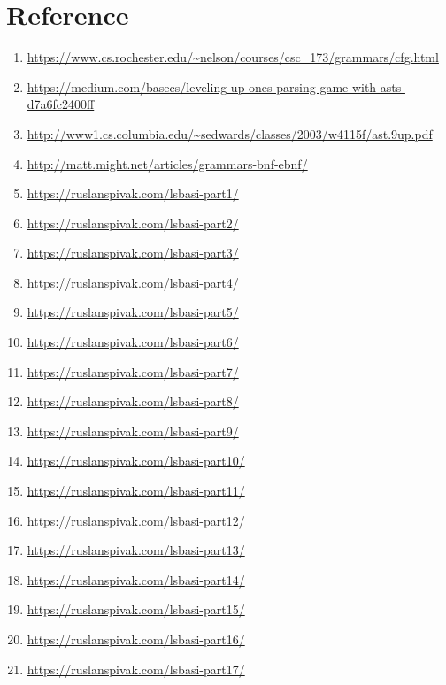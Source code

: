 \documentclass[14pt]{article}
\begin{document}
\newpage
\section{Reference}
\begin{enumerate}
\item\url{https://www.cs.rochester.edu/~nelson/courses/csc_173/grammars/cfg.html}
\item\url{https://medium.com/basecs/leveling-up-ones-parsing-game-with-asts-d7a6fc2400ff}
\item\url{http://www1.cs.columbia.edu/~sedwards/classes/2003/w4115f/ast.9up.pdf}
\item\url{http://matt.might.net/articles/grammars-bnf-ebnf/}
\item\url{https://ruslanspivak.com/lsbasi-part1/}
\item\url{https://ruslanspivak.com/lsbasi-part2/}
\item\url{https://ruslanspivak.com/lsbasi-part3/}
\item\url{https://ruslanspivak.com/lsbasi-part4/}
\item\url{https://ruslanspivak.com/lsbasi-part5/}
\item\url{https://ruslanspivak.com/lsbasi-part6/}
\item\url{https://ruslanspivak.com/lsbasi-part7/}
\item\url{https://ruslanspivak.com/lsbasi-part8/}
\item\url{https://ruslanspivak.com/lsbasi-part9/}
\item\url{https://ruslanspivak.com/lsbasi-part10/}
\item\url{https://ruslanspivak.com/lsbasi-part11/}
\item\url{https://ruslanspivak.com/lsbasi-part12/}
\item\url{https://ruslanspivak.com/lsbasi-part13/}
\item\url{https://ruslanspivak.com/lsbasi-part14/}
\item\url{https://ruslanspivak.com/lsbasi-part15/}
\item\url{https://ruslanspivak.com/lsbasi-part16/}
\item\url{https://ruslanspivak.com/lsbasi-part17/}
\end{enumerate}
\end{document}
